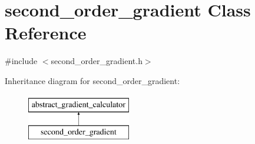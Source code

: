\hypertarget{classsecond__order__gradient}{\section{second\-\_\-order\-\_\-gradient Class Reference}
\label{classsecond__order__gradient}
}


{\ttfamily \#include $<$second\-\_\-order\-\_\-gradient.\-h$>$}

Inheritance diagram for second\-\_\-order\-\_\-gradient\-:\begin{figure}[H]
\begin{center}
\leavevmode
\includegraphics[height=2.000000cm]{classsecond__order__gradient}
\end{center}
\end{figure}
